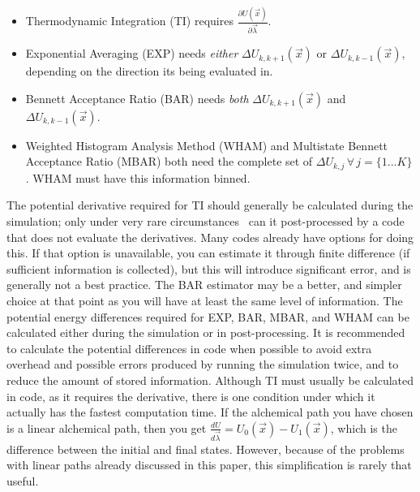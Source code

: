 \documentclass[9pt,bestpractices]{livecoms}
\begin{document}
%
\begin{itemize}
    \item Thermodynamic Integration (TI) requires $\frac{\partial U(\vec{x})}{\partial\vec{\lambda}}$.
    \item Exponential Averaging (EXP) needs \textit{either} $\Delta U_{k,k+1}(\vec{x})$ or $\Delta U_{k,k-1}(\vec{x})$, depending on the direction its being evaluated in.
    \item Bennett Acceptance Ratio (BAR) needs \textit{both} $\Delta U_{k,k+1}(\vec{x})$ and $\Delta U_{k,k-1}(\vec{x})$.
    \item Weighted Histogram Analysis Method (WHAM) and Multistate Bennett Acceptance Ratio (MBAR) both need the complete set of $\Delta U_{k,j} \, \forall \, j=\{1...K\}$. WHAM must have this information binned.
\end{itemize}
%
The potential derivative required for TI should generally be calculated during the simulation; only under very rare circumstances~\cite{naden2015linear} can it post-processed by a code that does not evaluate the derivatives. Many codes already have options for doing this.
If that option is unavailable, you can estimate it through finite difference (if sufficient information is collected), but this  will introduce significant error, and is generally not a best practice. The BAR estimator may be a better, and simpler choice at that point as you will have at least the same level of information. 
The potential energy differences required for EXP, BAR, MBAR, and WHAM can be calculated either during the simulation or in post-processing. It is recommended to calculate the potential differences in code when possible to avoid extra overhead and possible errors produced by running the simulation twice, and to reduce the amount of stored information. 
Although TI must usually be calculated in code, as it requires the derivative, there is one condition under which it actually has the fastest computation time. 
If the alchemical path you have chosen is a linear alchemical path, then you get $\frac{dU}{d\vec{\lambda}} = U_0(\vec{x}) - U_1(\vec{x})$, which is the difference between the initial and final states. 
However, because of the problems with linear paths already discussed in this paper, this simplification is rarely that useful.
%
\end{document}
